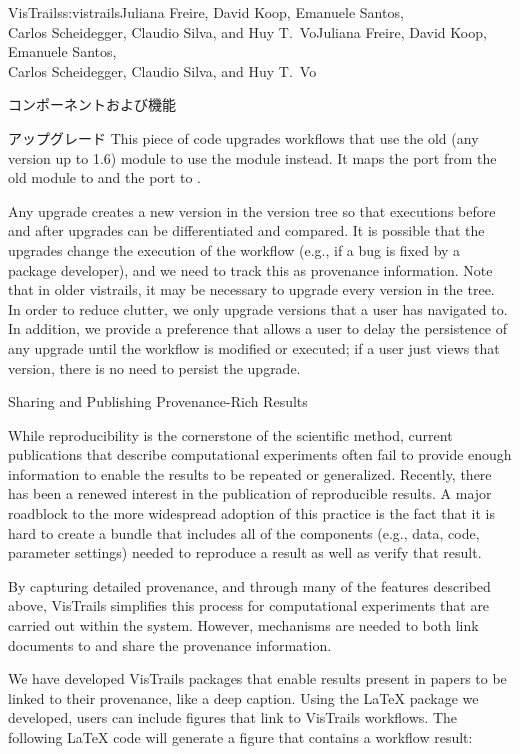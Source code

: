 \begin{aosachaptertoc}{VisTrails}{s:vistrails}{Juliana Freire, David Koop, Emanuele Santos, \\ Carlos Scheidegger, Claudio Silva, and Huy T.\ Vo}{Juliana Freire, David Koop, Emanuele Santos, \\ \hspace*{0.9cm} Carlos Scheidegger, Claudio Silva, and Huy T.\ Vo}
\begin{aosasect1}{コンポーネントおよび機能}
\begin{aosasect2}{アップグレード}
This piece of code upgrades workflows that use the old
 (any version up to 1.6) module to use the
 module instead.  It maps the  port from the
old module to  and the  port to
.

Any upgrade creates a new version in the version tree so that
executions before and after upgrades can be differentiated and
compared.  It is possible that the upgrades change the execution of
the workflow (e.g., if a bug is fixed by a package developer), and we
need to track this as provenance information.  Note that in older
vistrails, it may be necessary to upgrade every version in the tree.
In order to reduce clutter, we only upgrade versions that a user has
navigated to.  In addition, we provide a preference that allows a user
to delay the persistence of any upgrade until the workflow is modified
or executed; if a user just views that version, there is no need to
persist the upgrade.

\end{aosasect2}

\begin{aosasect2}{Sharing and Publishing Provenance-Rich Results}
\label{sec.vistrails.publish}

While reproducibility is the cornerstone of the scientific method,
current publications that describe computational experiments 
often fail to provide enough information to enable the results
to be repeated or generalized. Recently, there has been a renewed
interest in the publication of reproducible results. A major roadblock
to the more widespread adoption of this practice is the fact that it
is hard to create a bundle that includes all of the components (e.g.,
data, code, parameter settings) needed to reproduce a result as well
as verify that result.

By capturing detailed provenance, and through many of the features
described above, VisTrails simplifies this process for computational
experiments that are carried out within the system. However,
mechanisms are needed to both link documents to and share the
provenance information.

We have developed VisTrails packages that enable results present in
papers to be linked to their provenance, like a deep caption. Using
the LaTeX package we developed, users can include figures that link to
VisTrails workflows.  The following LaTeX code will generate a figure
that contains a workflow result:


\end{aosasect2}
\end{aosasect1}
\end{aosachaptertoc}
